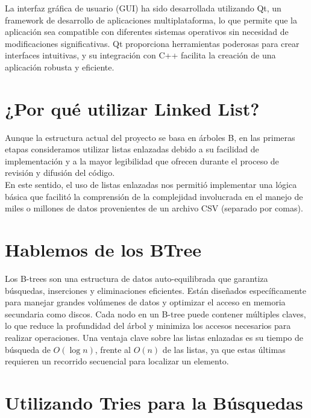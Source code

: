 \documentclass[corference]{IEEEtran}
\begin{document}
\begin{flushleft}
        \noindent\hspace*{4em}La interfaz gráfica de usuario (GUI) ha sido desarrollada utilizando Qt, un framework de desarrollo de aplicaciones multiplataforma, lo que permite que la aplicación sea compatible con diferentes sistemas operativos sin necesidad de modificaciones significativas. Qt proporciona herramientas poderosas para crear interfaces intuitivas, y su integración con C++ facilita la creación de una aplicación robusta y eficiente.\\
    
        \newpage
        
        \section{¿Por qué utilizar Linked List?}
        \noindent\hspace*{4em}Aunque la estructura actual del proyecto se basa en árboles B, en las primeras etapas consideramos utilizar listas enlazadas debido a su facilidad de implementación y a la mayor legibilidad que ofrecen durante el proceso de revisión y difusión del código.\\
        \noindent\hspace*{4em}En este sentido, el uso de listas enlazadas nos permitió implementar una lógica básica que facilitó la comprensión de la complejidad involucrada en el manejo de miles o millones de datos provenientes de un archivo CSV (separado por comas).
        
        \section{Hablemos de los BTree}
        \noindent\hspace*{4em}Los B-trees son una estructura de datos auto-equilibrada que garantiza búsquedas, inserciones y eliminaciones eficientes. Están diseñados específicamente para manejar grandes volúmenes de datos y optimizar el acceso en memoria secundaria como discos. Cada nodo en un B-tree puede contener múltiples claves, lo que reduce la profundidad del árbol y minimiza los accesos necesarios para realizar operaciones. Una ventaja clave sobre las listas enlazadas es su tiempo de búsqueda de \(O(\log n)\), frente al \(O(n)\) de las listas, ya que estas últimas requieren un recorrido secuencial para localizar un elemento.\\

        \section{Utilizando Tries para la Búsquedas}


\end{flushleft}
\end{document}
